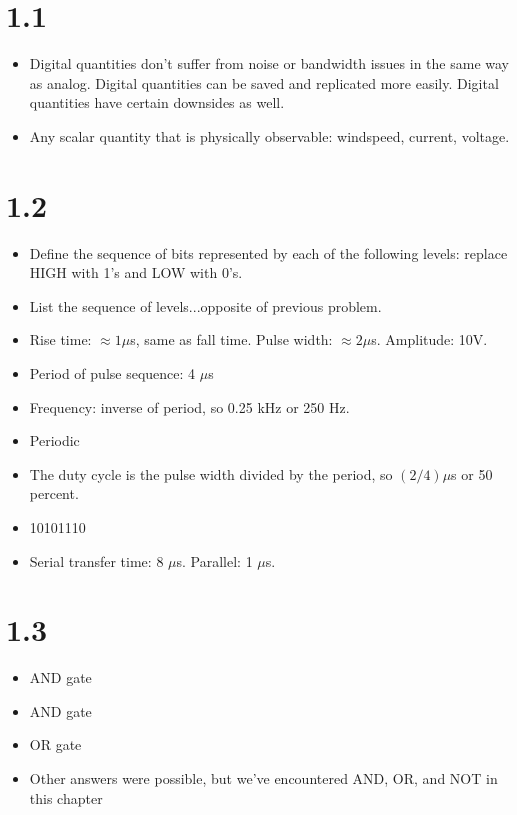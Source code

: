 \documentclass[10pt]{article}
\begin{document}
\maketitle

\section{1.1}

\begin{itemize}
\item Digital quantities don't suffer from noise or bandwidth issues in the same way as analog.  Digital quantities can be saved and replicated more easily.  Digital quantities have certain downsides as well.
\item Any scalar quantity that is physically observable: windspeed, current, voltage.
\end{itemize}

\section{1.2}

\begin{itemize}
\item Define the sequence of bits represented by each of the following levels: replace HIGH with 1's and LOW with 0's.
\item List the sequence of levels...opposite of previous problem.
\item Rise time: $\approx 1\mu$s, same as fall time.  Pulse width: $\approx 2\mu$s.  Amplitude: 10V.
\item Period of pulse sequence: 4 $\mu$s
\item Frequency: inverse of period, so 0.25 kHz or 250 Hz.
\item Periodic
\item The duty cycle is the pulse width divided by the period, so $(2/4) \mu$s or 50 percent.
\item 10101110
\item Serial transfer time: 8 $\mu$s.  Parallel: 1 $\mu$s.
\end{itemize}

\section{1.3}

\begin{itemize}
\item AND gate
\item AND gate
\item OR gate
\item Other answers were possible, but we've encountered AND, OR, and NOT in this chapter
\end{itemize}
\end{document}
